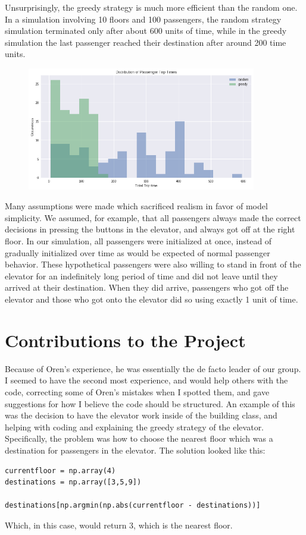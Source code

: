 \documentclass{article}
\begin{document}
Unsurprisingly, the greedy strategy is much more efficient than the random one. In a simulation involving 10 floors and 100 passengers, the random strategy simulation terminated only after about 600 units of time, while in the greedy simulation the last passenger reached their destination after around 200 time units. 

\begin{figure}[h]
\center
\includegraphics[width = 10cm]{Comparison.png}
\end{figure}

\newgeometry

Many assumptions were made which sacrificed realism in favor of model simplicity. We assumed, for example, that all passengers always made the correct decisions in pressing the buttons in the elevator, and always got off at the right floor. In our simulation, all passengers were initialized at once, instead of gradually initialized over time as would be expected of normal passenger behavior. These hypothetical passengers were also willing to stand in front of the elevator for an indefinitely long period of time and did not leave until they arrived at their destination. When they did arrive, passengers who got off the elevator and those who got onto the elevator did so using exactly 1 unit of time. 

\section*{Contributions to the Project}
Because of Oren's experience, he was essentially the de facto leader of our group. I seemed to have the second most experience, and would help others with the code, correcting some of Oren's mistakes when I spotted them, and gave suggestions for how I believe the code should be structured. An example of this was the decision to have the elevator work inside of the building class, and helping with coding and explaining the greedy strategy of the elevator. Specifically, the problem was how to choose the nearest floor which was a destination for passengers in the elevator.  The solution looked like this: 
 \begin{verbatim}
currentfloor = np.array(4)
destinations = np.array([3,5,9])

destinations[np.argmin(np.abs(currentfloor - destinations))]	
\end{verbatim}
 Which, in this case, would return 3, which is the nearest floor. 
\end{document}
